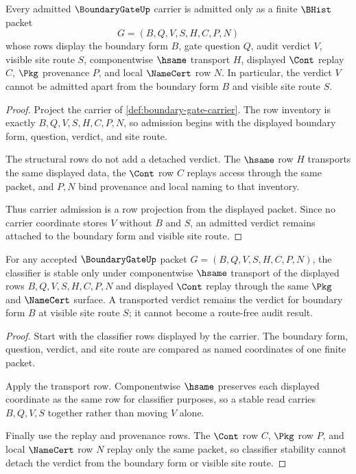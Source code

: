 \begin{theorem}
\label{thm:boundarygate-carrier-admission}
Every admitted $\BoundaryGateUp$ carrier is admitted only as a finite $\BHist$ packet
$$
G=(B,Q,V,S,H,C,P,N)
$$
whose rows display the boundary form $B$, gate question $Q$, audit verdict $V$, visible site route $S$, componentwise $\hsame$ transport $H$, displayed $\Cont$ replay $C$, $\Pkg$ provenance $P$, and local $\NameCert$ row $N$. In particular, the verdict $V$ cannot be admitted apart from the boundary form $B$ and visible site route $S$.
\end{theorem}
\begin{proof}
Project the carrier of \autoref{def:boundary-gate-carrier}. The row inventory is exactly $B,Q,V,S,H,C,P,N$, so admission begins with the displayed boundary form, question, verdict, and site route.

The structural rows do not add a detached verdict. The $\hsame$ row $H$ transports the same displayed data, the $\Cont$ row $C$ replays access through the same packet, and $P,N$ bind provenance and local naming to that inventory.

Thus carrier admission is a row projection from the displayed packet. Since no carrier coordinate stores $V$ without $B$ and $S$, an admitted verdict remains attached to the boundary form and visible site route.
\end{proof}

\begin{theorem}
\label{thm:boundarygate-classifier-stability}
For any accepted $\BoundaryGateUp$ packet $G=(B,Q,V,S,H,C,P,N)$, the classifier is stable only under componentwise $\hsame$ transport of the displayed rows $B,Q,V,S,H,C,P,N$ and displayed $\Cont$ replay through the same $\Pkg$ and $\NameCert$ surface. A transported verdict remains the verdict for boundary form $B$ at visible site route $S$; it cannot become a route-free audit result.
\end{theorem}
\begin{proof}
Start with the classifier rows displayed by the carrier. The boundary form, question, verdict, and site route are compared as named coordinates of one finite packet.

Apply the transport row. Componentwise $\hsame$ preserves each displayed coordinate as the same row for classifier purposes, so a stable read carries $B,Q,V,S$ together rather than moving $V$ alone.

Finally use the replay and provenance rows. The $\Cont$ row $C$, $\Pkg$ row $P$, and local $\NameCert$ row $N$ replay only the same packet, so classifier stability cannot detach the verdict from the boundary form or visible site route.
\end{proof}

